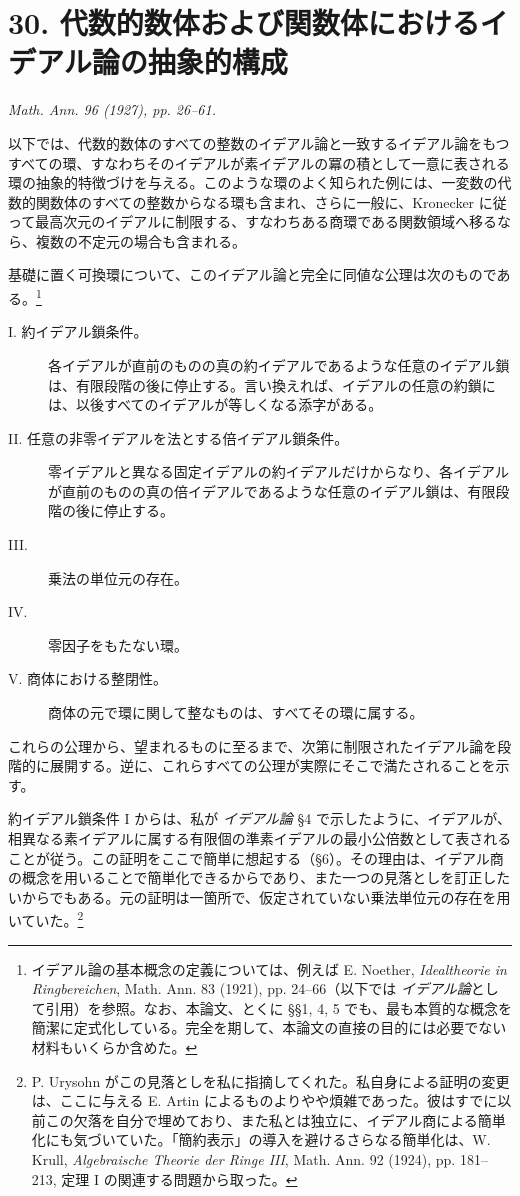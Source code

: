 \documentclass[11pt]{article}
\begin{document}
\section*{30. 代数的数体および関数体におけるイデアル論の抽象的構成}
\noindent\emph{Math. Ann. 96 (1927), pp. 26--61.}

以下では、代数的数体のすべての整数のイデアル論と一致するイデアル論をもつすべての環、すなわちそのイデアルが素イデアルの冪の積として一意に表される環の抽象的特徴づけを与える。このような環のよく知られた例には、一変数の代数的関数体のすべての整数からなる環も含まれ、さらに一般に、Kronecker に従って最高次元のイデアルに制限する、すなわちある商環である関数領域へ移るなら、複数の不定元の場合も含まれる。

基礎に置く可換環について、このイデアル論と完全に同値な公理は次のものである。\footnote{イデアル論の基本概念の定義については、例えば E. Noether, \emph{Idealtheorie in Ringbereichen}, Math. Ann. 83 (1921), pp. 24--66（以下では \emph{イデアル論}として引用）を参照。なお、本論文、とくに §§1, 4, 5 でも、最も本質的な概念を簡潔に定式化している。完全を期して、本論文の直接の目的には必要でない材料もいくらか含めた。}

\begin{description}
\item[I. 約イデアル鎖条件。] 各イデアルが直前のものの真の約イデアルであるような任意のイデアル鎖は、有限段階の後に停止する。言い換えれば、イデアルの任意の約鎖には、以後すべてのイデアルが等しくなる添字がある。
\item[II. 任意の非零イデアルを法とする倍イデアル鎖条件。] 零イデアルと異なる固定イデアルの約イデアルだけからなり、各イデアルが直前のものの真の倍イデアルであるような任意のイデアル鎖は、有限段階の後に停止する。
\item[III.] 乗法の単位元の存在。
\item[IV.] 零因子をもたない環。
\item[V. 商体における整閉性。] 商体の元で環に関して整なものは、すべてその環に属する。
\end{description}

これらの公理から、望まれるものに至るまで、次第に制限されたイデアル論を段階的に展開する。逆に、これらすべての公理が実際にそこで満たされることを示す。

約イデアル鎖条件 I からは、私が \emph{イデアル論} §4 で示したように、イデアルが、相異なる素イデアルに属する有限個の準素イデアルの最小公倍数として表されることが従う。この証明をここで簡単に想起する（§6）。その理由は、イデアル商の概念を用いることで簡単化できるからであり、また一つの見落としを訂正したいからでもある。元の証明は一箇所で、仮定されていない乗法単位元の存在を用いていた。\footnote{P. Urysohn がこの見落としを私に指摘してくれた。私自身による証明の変更は、ここに与える E. Artin によるものよりやや煩雑であった。彼はすでに以前この欠落を自分で埋めており、また私とは独立に、イデアル商による簡単化にも気づいていた。「簡約表示」の導入を避けるさらなる簡単化は、W. Krull, \emph{Algebraische Theorie der Ringe III}, Math. Ann. 92 (1924), pp. 181--213, 定理 I の関連する問題から取った。}
\end{document}
